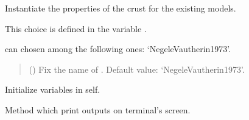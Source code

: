\documentclass[letterpaper,10pt,english]{sphinxmanual}
\begin{document}
\begin{fulllineitems}
\label{\detokenize{source/api/setup_crust:nucleardatapy.crust.setup_crust.setupCrust}}
\pysigstartsignatures
{}
\pysigstopsignatures
\sphinxAtStartPar
Instantiate the properties of the crust for the existing models.

\sphinxAtStartPar
This choice is defined in the variable .

\sphinxAtStartPar
{} can chosen among the following ones: ‘Negele\sphinxhyphen{}Vautherin\sphinxhyphen{}1973’.
\begin{quote}\begin{description}
\sphinxAtStartPar
{} (\sphinxstyleliteralemphasis{\sphinxupquote{, }}) \textendash{} Fix the name of . Default value: ‘Negele\sphinxhyphen{}Vautherin\sphinxhyphen{}1973’.

\end{description}\end{quote}

\sphinxAtStartPar
{}

\begin{fulllineitems}
\label{\detokenize{source/api/setup_crust:nucleardatapy.crust.setup_crust.setupCrust.init_self}}
\pysigstartsignatures
{}
\pysigstopsignatures
\sphinxAtStartPar
Initialize variables in self.

\end{fulllineitems}


\begin{fulllineitems}
\label{\detokenize{source/api/setup_crust:nucleardatapy.crust.setup_crust.setupCrust.print_outputs}}
\pysigstartsignatures
{}
\pysigstopsignatures
\sphinxAtStartPar
Method which print outputs on terminal’s screen.

\end{fulllineitems}


\end{fulllineitems}
\end{document}

